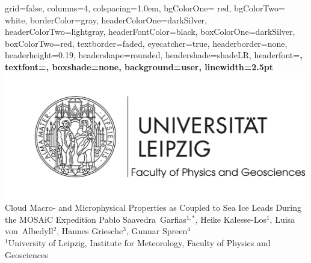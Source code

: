 \documentclass[landscape,a0paper,fontscale=0.45,margin=1cm]{baposter/baposter}
\begin{document}
\begin{poster}%
  {
  grid=false, %
  columns=4,
  colspacing=1.0em,
  bgColorOne= red, %
  bgColorTwo= white, %
  borderColor=gray, %
  headerColorOne=darkSilver, %
  headerColorTwo=lightgray, 
  headerFontColor=black, %
  boxColorOne=darkSilver, %
  boxColorTwo=red, %
  textborder=faded,
  eyecatcher=true,
  headerborder=none, %
  headerheight=0.19\textheight,
  headershape=rounded, %
  headershade=shadeLR,
  headerfont=\LARGE\bf,  %
  textfont={\color{black}\setlength{\parindent}{1.5em}},
  boxshade=none, %
  background=user, %
  linewidth=2.5pt
  }
  {
      \includegraphics[height=15.0em]{baposter/uni_leipzig-logo.png}\\
  }
  {
  	Cloud Macro- and Microphysical Properties as Coupled to Sea Ice Leads During\\the MOSAiC Expedition
  }
  {\vspace{+1em} \color{black}Pablo Saavedra~Garfias$^{1,*}$, Heike Kalesse-Los$^{1}$, Luisa von~Albedyll$^{2}$, Hannes Griesche$^{3}$, Gunnar Spreen$^{4}$\\
    $^1$University of Leipzig, Institute for Meteorology, Faculty of Physics and Geosciences\\
}
\end{poster}
\end{document}

